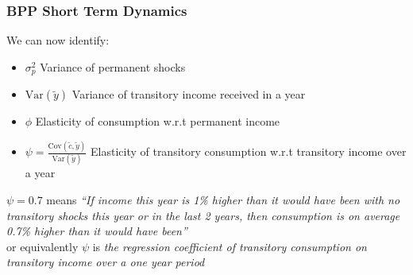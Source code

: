 \documentclass{beamer}
\begin{document}
{
	\frametitle{BPP Short Term Dynamics}
	We can now identify:
	\begin{itemize}
		\item $\sigma^2_p$ Variance of permanent shocks
		\item $\mathrm{Var}(\tilde{y})$ Variance of transitory income received in a year
		\item $\phi$ Elasticity of consumption w.r.t permanent income
		\item $\psi = \frac{\mathrm{Cov}(\tilde{c},\tilde{y})}{\mathrm{Var}(\tilde{y})}$ Elasticity of transitory consumption w.r.t transitory income over a year
	\end{itemize}
	\pause
	$\psi=0.7$ means \textit{``If income this year is 1\% higher than it would have been with no transitory shocks this year or in the last 2 years, then consumption is on average 0.7\% higher than it would have been''}\\
	\bigskip
	or equivalently $\psi$ is \textit{the regression coefficient of transitory consumption on transitory income over a one year period}
}
\end{document}

